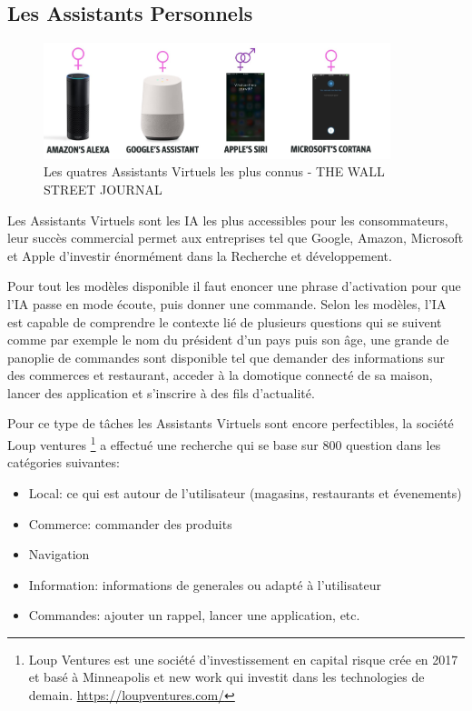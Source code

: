 \subsection{Les Assistants Personnels}
\begin{figure}[h]
    \centering
    \includegraphics[width=0.9\textwidth]{Images/virtualassistant}
    \caption{Les quatres Assistants Virtuels les plus connus - THE WALL STREET JOURNAL}
    \label{fig:virtualassistant}
\end{figure}

Les Assistants Virtuels sont les IA les plus accessibles pour les consommateurs, leur succès commercial 
permet aux entreprises tel que Google, Amazon, Microsoft et Apple d'investir énormément 
dans la Recherche et développement. 

Pour tout les modèles disponible il faut enoncer une phrase d'activation pour que 
l'IA passe en mode écoute, puis donner une commande. Selon les modèles, l'IA 
est capable de comprendre le contexte lié de plusieurs questions qui se suivent 
comme par exemple le nom du président d'un pays puis son âge, une grande de panoplie de 
commandes sont disponible tel que demander des informations sur des commerces et restaurant,
acceder à la domotique connecté de sa maison, lancer des application et s'inscrire à des fils 
d'actualité. 

Pour ce type de tâches les Assistants Virtuels sont encore perfectibles, 
la société Loup ventures
\footnote{ Loup Ventures est une société d'investissement en capital risque crée en 2017 et 
basé à Minneapolis et new work qui investit dans les technologies de demain. \newline
\url{https://loupventures.com/} } 
a effectué une recherche qui se base sur 800 question dans les 
catégories suivantes: 

\begin{itemize}
    \item Local: ce qui est autour de l'utilisateur (magasins, restaurants et évenements)
    \item Commerce: commander des produits 
    \item Navigation
    \item Information: informations de generales ou adapté à l'utilisateur 
    \item Commandes: ajouter un rappel, lancer une application, etc. 
\end{itemize}

